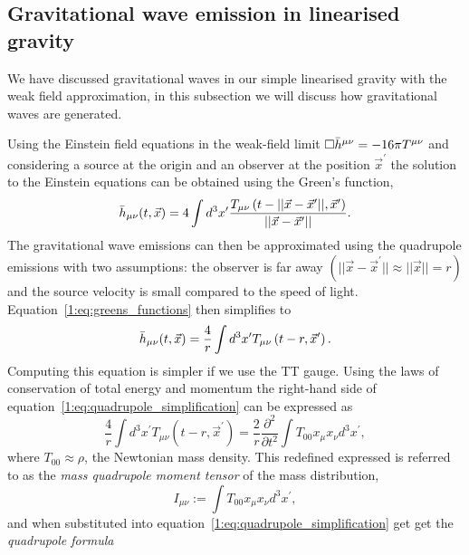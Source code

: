 \subsection{\label{}Gravitational wave emission in linearised gravity}

We have discussed gravitational waves in our simple linearised gravity with the weak field approximation, in this subsection we will discuss how gravitational waves are generated.

Using the Einstein field equations in the weak-field limit $\Box \Bar{h}^{\mu\nu} = -16 \pi T^{\mu\nu}$ and considering a source at the origin and an observer at the position $\vec{x}^{\prime}$ the solution to the Einstein equations can be obtained using the Green's function,
%
\begin{equation}
    \Bar{h}_{\mu\nu}(t, \vec{x}) = 4 \int d^3 x^{\prime} \frac{T_{\mu\nu}\left(t - ||\vec{x} - \vec{x}^{\prime}||, \vec{x}^{\prime}\right)}{||\vec{x} - \vec{x}^{\prime}||} .
    \label{1:eq:greens_functions}
\end{equation}
%
The gravitational wave emissions can then be approximated using the quadrupole emissions with two assumptions: the observer is far away $\left(||\vec{x} - \vec{x}^{\prime}|| \approx ||\vec{x}|| = r\right)$ and the source velocity is small compared to the speed of light. Equation~\ref{1:eq:greens_functions} then simplifies to
%
\begin{equation}
    \Bar{h}_{\mu\nu}(t, \vec{x}) = \frac{4}{r} \int d^3 x^{\prime} T_{\mu\nu}\left(t - r, \vec{x}^{\prime}\right) .
    \label{1:eq:quadrupole_simplification}
\end{equation}
%
Computing this equation is simpler if we use the TT gauge. Using the laws of conservation of total energy and momentum the right-hand side of equation~\ref{1:eq:quadrupole_simplification} can be expressed as
%
\begin{equation}
    \frac{4}{r} \int d^3 x^{\prime} T_{\mu\nu}\left(t - r, \vec{x}^{\prime}\right) = \frac{2}{r}\frac{\partial^{2}}{\partial t^{2}} \int T_{00} x_{\mu} x_{\nu} d^{3} x^{\prime},
\end{equation}
%
where $T_{00} \approx \rho$, the Newtonian mass density. This redefined expressed is referred to as the \textit{mass quadrupole moment tensor} of the mass distribution,
%
\begin{equation}
    I_{\mu\nu} := \int T_{00} x_{\mu} x_{\nu} d^{3} x^{\prime} ,
    \label{1:eq:quadrupole_moment_tensor}
\end{equation}
%
and when substituted into equation~\ref{1:eq:quadrupole_simplification} get get the \textit{quadrupole formula}
